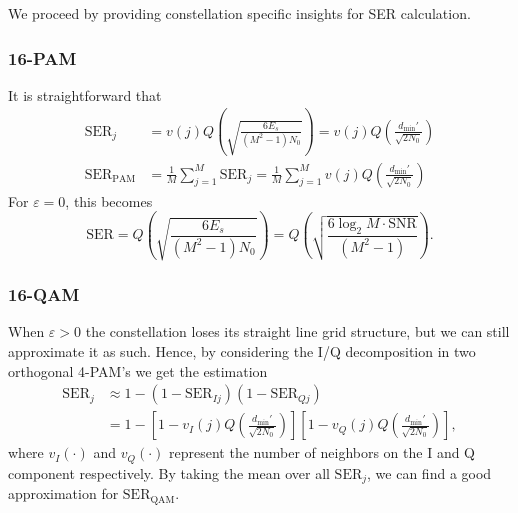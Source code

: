 \documentclass[11pt,a4paper,onecolumn,final]{article}
\newcommand{\dmin}{d_\text{min}}
\newcommand{\eps}{\varepsilon}
\begin{document}
We proceed by providing constellation specific insights for SER calculation. 

\subsubsection*{16-PAM}
It is straightforward that
\begin{align}
    \text{SER}_j &= v(j)Q\left(\sqrt{\frac{6E_s }{(M^2 - 1) N_0}}\right) = v(j)Q\left(\frac{\dmin ' }{\sqrt{2N_0}}\right) \\
    \text{SER}_\text{PAM} &= \frac{1}{M }\sum_{j = 1}^{M } \text{SER}_j = \frac{1}{M }\sum_{j = 1}^{M }v(j)Q\left(\frac{\dmin ' }{\sqrt{2N_0}}\right)
\end{align}
For \(\eps = 0\), this becomes 
\begin{equation}
    \text{SER} = Q\left(\sqrt{\frac{6E_s }{(M^2 - 1) N_0}}\right) = Q\left(\sqrt{\frac{6\log_2 M \cdot\text{SNR}}{(M^2 - 1)}}\right).
\end{equation}

\subsubsection*{16-QAM}
When \(\eps > 0\) the constellation loses its straight line grid structure, but we can still approximate it as such. Hence, by considering the I/Q decomposition in two orthogonal 4-PAM's we get the estimation
\begin{align}
    \text{SER}_j &\approx 1 - (1 - \text{SER}_{Ij})(1 - \text{SER}_{Qj}) \\
        &=  1 - \left[1 - v_I(j)Q\left(\frac{\dmin ' }{\sqrt{2N_0}}\right)\right]\left[1 - v_Q(j)Q\left(\frac{\dmin ' }{\sqrt{2N_0}}\right)\right],
\end{align}
where \(v_I(\cdot)\) and \(v_Q(\cdot)\) represent the number of neighbors on the I and Q component respectively. By taking the mean over all \(\text{SER}_j\), we can find a good approximation for \(\text{SER}_\text{QAM}\). 
\end{document}
